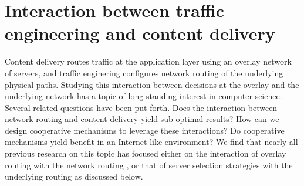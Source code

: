\section{Interaction between traffic engineering and content delivery}

Content delivery routes traffic at the application layer using an overlay network of servers, and traffic enginering configures network routing of the underlying physical paths. Studying this interaction between decisions at the overlay and the underlying network has a topic of long standing interest in computer science. Several related questions have been put forth. Does the interaction between network routing and content delivery yield sub-optimal results? How can we design cooperative mechanisms to leverage these interactions? Do cooperative mechanisms yield benefit in an Internet-like environment? We find that nearly all previous research on this topic has focused either on the interaction of overlay routing with the network routing \cite{Roughgarden,selfishQiu}, or that of server selection strategies with the underlying routing  \cite{Jiang2009,JohariGameTheory, CATE, P4P} as discussed below. 




